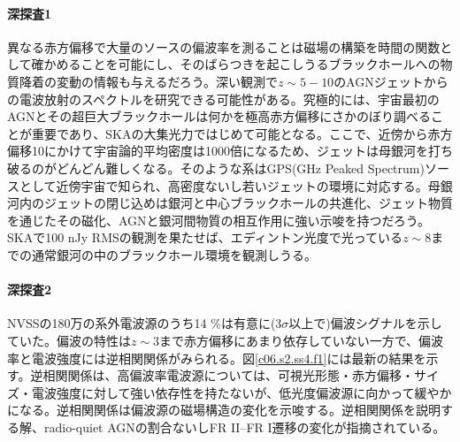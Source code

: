 \paragraph{深探査1}

異なる赤方偏移で大量のソースの偏波率を測ることは磁場の構築を時間の関数として確かめることを可能にし、そのばらつきを起こしうるブラックホールへの物質降着の変動の情報も与えるだろう。深い観測で$z \sim 5-10$のAGNジェットからの電波放射のスペクトルを研究できる可能性がある。究極的には、宇宙最初のAGNとその超巨大ブラックホールは何かを極高赤方偏移にさかのぼり調べることが重要であり、SKAの大集光力ではじめて可能となる。ここで、近傍から赤方偏移10にかけて宇宙論的平均密度は1000倍になるため、ジェットは母銀河を打ち破るのがどんどん難しくなる。そのような系はGPS(GHz Peaked Spectrum)ソースとして近傍宇宙で知られ、高密度ないし若いジェットの環境に対応する\citep{1998PASP..110..493O}。母銀河内のジェットの閉じ込めは銀河と中心ブラックホールの共進化、ジェット物質を通じたその磁化、AGNと銀河間物質の相互作用に強い示唆を持つだろう。SKAで100 nJy RMSの観測を果たせば、エディントン光度で光っている$z\sim 8$までの通常銀河の中のブラックホール環境を観測しうる。

\paragraph{深探査2}

NVSSの180万の系外電波源のうち14 \%は有意に(3$\sigma$以上で)偏波シグナルを示していた\citep{1998AJ....115.1693C, 2003AJ....125..465H}。偏波の特性は$z\sim 3$まで赤方偏移にあまり依存していない一方で、偏波率と電波強度には逆相関関係がみられる\citep{2002A&A...396..463M,2007ApJ...666..201T}。図\ref{c06.s2.ss4.f1}には最新の結果を示す。逆相関関係は、高偏波率電波源については、可視光形態・赤方偏移・サイズ・電波強度に対して強い依存性を持たない\citep{2010MNRAS.409..821S}が、低光度偏波源に向かって緩やかになる\citep{2014ApJ...787...99S}。逆相関関係は偏波源の磁場構造の変化を示唆する。逆相関関係を説明する解、radio-quiet AGNの割合ないしFR II--FR I遷移の変化が指摘されている。

